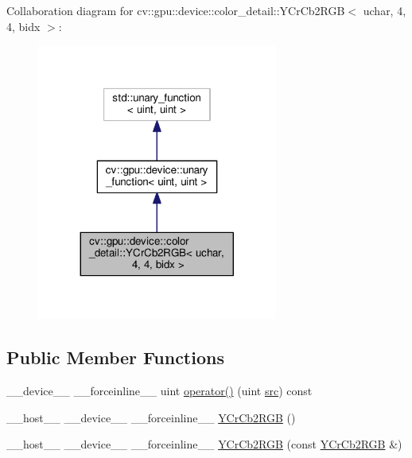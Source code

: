 Collaboration diagram for cv\-:\-:gpu\-:\-:device\-:\-:color\-\_\-detail\-:\-:Y\-Cr\-Cb2\-R\-G\-B$<$ uchar, 4, 4, bidx $>$\-:\nopagebreak
\begin{figure}[H]
\begin{center}
\leavevmode
\includegraphics[width=224pt]{structcv_1_1gpu_1_1device_1_1color__detail_1_1YCrCb2RGB_3_01uchar_00_014_00_014_00_01bidx_01_4__coll__graph}
\end{center}
\end{figure}
\subsection*{Public Member Functions}
\begin{DoxyCompactItemize}
\item 
\-\_\-\-\_\-device\-\_\-\-\_\- \-\_\-\-\_\-forceinline\-\_\-\-\_\- uint \hyperlink{structcv_1_1gpu_1_1device_1_1color__detail_1_1YCrCb2RGB_3_01uchar_00_014_00_014_00_01bidx_01_4_a9a951b27f32f4693bba4437e6056a3b0}{operator()} (uint \hyperlink{legacy_8hpp_a371cd109b74033bc4366f584edd3dacc}{src}) const 
\item 
\-\_\-\-\_\-host\-\_\-\-\_\- \-\_\-\-\_\-device\-\_\-\-\_\- \-\_\-\-\_\-forceinline\-\_\-\-\_\- \hyperlink{structcv_1_1gpu_1_1device_1_1color__detail_1_1YCrCb2RGB_3_01uchar_00_014_00_014_00_01bidx_01_4_af754cb60e7a908d922f9cadd59f12116}{Y\-Cr\-Cb2\-R\-G\-B} ()
\item 
\-\_\-\-\_\-host\-\_\-\-\_\- \-\_\-\-\_\-device\-\_\-\-\_\- \-\_\-\-\_\-forceinline\-\_\-\-\_\- \hyperlink{structcv_1_1gpu_1_1device_1_1color__detail_1_1YCrCb2RGB_3_01uchar_00_014_00_014_00_01bidx_01_4_a717fb6aeaf6677d3d569b4712669d22f}{Y\-Cr\-Cb2\-R\-G\-B} (const \hyperlink{structcv_1_1gpu_1_1device_1_1color__detail_1_1YCrCb2RGB}{Y\-Cr\-Cb2\-R\-G\-B} \&)
\end{DoxyCompactItemize}


